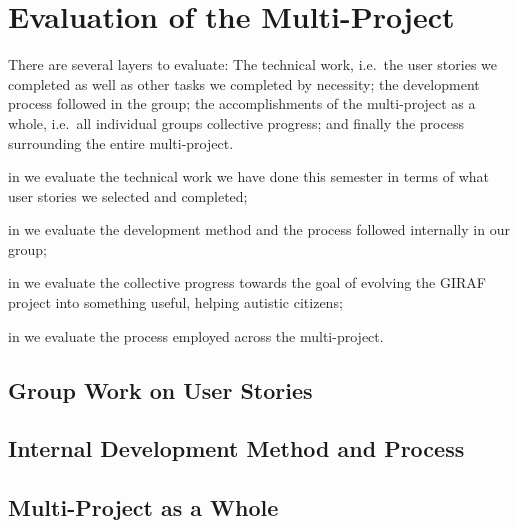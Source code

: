 \chapter{Evaluation of the Multi-Project}\label{chap:evaluation}

There are several layers to evaluate: The technical work, i.e.\ the user stories we completed as well as other tasks we completed by necessity; the development process followed in the group; the accomplishments of the multi-project as a whole, i.e.\ all individual groups collective progress; and finally the process surrounding the entire multi-project. 

\begin{chapterorganization}
  \item in  we evaluate the technical work we have done this semester in terms of what user stories we selected and completed;
  \item in  we evaluate the development method and the process followed internally in our group;
  \item in  we evaluate the collective progress towards the goal of evolving the GIRAF project into something useful, helping autistic citizens;
  \item in  we evaluate the process employed across the multi-project.
\end{chapterorganization}

\section{Group Work on User Stories}\label{conc:userstories}

\section{Internal Development Method and Process}\label{conc:internalprocess}

\section{Multi-Project as a Whole}\label{conc:multi_project_eval}

